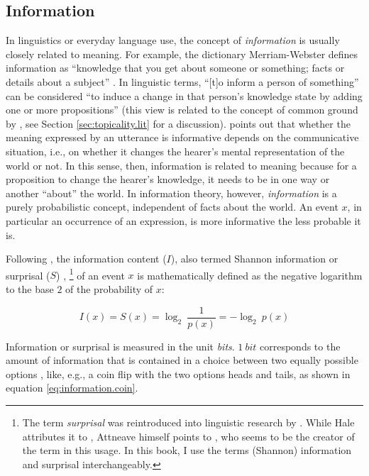 \subsection{Information} 
In linguistics or everyday language use, the concept of \textit{information} is usually closely related to meaning.
For example, the dictionary Merriam-Webster defines information as ``knowledge that you get about someone or something; facts or details about a subject'' \citep{information.webster}.
In linguistic terms, ``[t]o inform a person of something'' can be considered ``to induce a change in that person's knowledge state by adding one or more propositions'' \citep[44]{lambrecht1994} (this view is related to the concept of common ground  by \citet{stalnaker1974,stalnaker1978, stalnaker2002}, see Section \ref{sec:topicality.lit} for a discussion).
\citet[43]{lambrecht1994} points out that whether the meaning expressed by an utterance is informative depends on the communicative situation, i.e., on whether it changes the hearer's mental representation of the world or not.
In this sense, then, information is related to meaning because for a proposition to change the hearer's knowledge, it needs to be in one way or another ``about'' the world.
In information theory, however, \textit{information} is a purely probabilistic concept, independent of facts about the world.
An event $x$, in particular an occurrence of an expression, is more informative the less probable it is.

Following \citet{shannon1948}, the information content ($I$), also termed Shannon information or surprisal ($S$) \citep{samson1953,attneave1959,hale2001},%
\footnote{The term \textit{surprisal} was reintroduced into linguistic research by \citet[159]{hale2001}.
While Hale attributes it to \citet[6]{attneave1959}, Attneave himself points to \citet[293]{samson1953}, who seems to be the creator of the term in this usage.
In this book, I use the terms (Shannon) information and surprisal interchangeably.}
%
of an event $x$ is mathematically defined as the negative logarithm to the base $2$ of the probability of $x$:

\begin{equation}
\label{eq:information}
I(x) = S(x) = \log_{2}\ \frac{1}{p(x)} = \mathbin{-}\log_{2}\ p(x) 
\end{equation}

\noindent
Information or surprisal is measured in the unit \textit{bits}.
$1\ bit$ corresponds to the amount of information that is contained in a choice between two equally possible options \citep[380]{shannon1948}, like, e.g., a coin flip with the two options heads and tails, as shown in equation \ref{eq:information.coin}.

